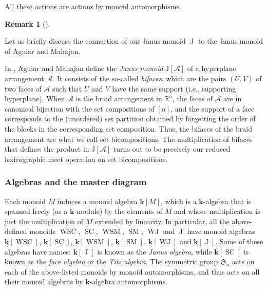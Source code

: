 \documentclass[numbers=enddot,12pt,final,onecolumn,notitlepage]{scrartcl}%
\theoremstyle{definition}
\newtheorem{remk}[theo]{Remark}
\newenvironment{remark}[1][]
{\begin{remk}[#1]\begin{leftbar}}
{\end{leftbar}\end{remk}}
\begin{document}
All these actions are actions by monoid automorphisms.

\begin{remark}
\label{rmk.PNSym.AM1}Let us briefly discuss the connection of our Janus monoid
$\operatorname*{J}$ to the Janus monoid of Aguiar and Mahajan.

In \cite[\S 1.9.3]{AguMah20}, Aguiar and Mahajan define the \emph{Janus
monoid} $\mathrm{J}\left[  \mathcal{A}\right]  $ of a hyperplane arrangement
$\mathcal{A}$. It consists of the so-called \emph{bifaces}, which are the
pairs $\left(  U,V\right)  $ of two faces of $\mathcal{A}$ such that $U$ and
$V$ have the same support (i.e., supporting hyperplane). When $\mathcal{A}$ is
the braid arrangement in $\mathbb{R}^{n}$, the faces of $\mathcal{A}$ are in
canonical bijection with the set compositions of $\left[  n\right]  $, and the
support of a face corresponds to the (unordered) set partition obtained by
forgetting the order of the blocks in the corresponding set composition. Thus,
the bifaces of the braid arrangement are what we call set bicompositions. The
multiplication of bifaces that defines the product in $\mathrm{J}\left[
\mathcal{A}\right]  $ turns out to be precisely our reduced lexicographic meet
operation on set bicompositions.
\end{remark}

\subsubsection{Algebras and the master diagram}

Each monoid $M$ induces a monoid algebra $\mathbf{k}\left[  M\right]  $, which
is a $\mathbf{k}$-algebra that is spanned freely (as a $\mathbf{k}$-module) by
the elements of $M$ and whose multiplication is just the multiplication of $M$
extended by linearity. In particular, all the above-defined monoids
$\operatorname*{WSC}$, $\operatorname*{SC}$, $\operatorname*{WSM}$,
$\operatorname*{SM}$, $\operatorname*{WJ}$ and $\operatorname*{J}$ have monoid
algebras $\mathbf{k}\left[  \operatorname*{WSC}\right]  $, $\mathbf{k}\left[
\operatorname*{SC}\right]  $, $\mathbf{k}\left[  \operatorname*{WSM}\right]
$, $\mathbf{k}\left[  \operatorname*{SM}\right]  $, $\mathbf{k}\left[
\operatorname*{WJ}\right]  $ and $\mathbf{k}\left[  \operatorname*{J}\right]
$. Some of these algebras have names: $\mathbf{k}\left[  \operatorname*{J}%
\right]  $ is known as the \emph{Janus algebra}, while $\mathbf{k}\left[
\operatorname*{SC}\right]  $ is known as the \emph{face algebra} or the
\emph{Tits algebra}. The symmetric group $\mathfrak{S}_{n}$ acts on each of
the above-listed monoids by monoid automorphisms, and thus acts on all their
monoid algebras by $\mathbf{k}$-algebra automorphisms.
\end{document}
